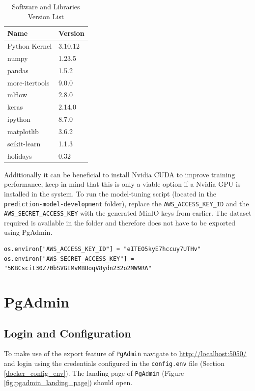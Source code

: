 \begin{table}[H]
\centering
\begin{tabular}{ll}
\hline
\textbf{Name}         & \textbf{Version} \\ \hline
Python Kernel & 3.10.12      \\
numpy         & 1.23.5       \\
pandas        & 1.5.2        \\
more-itertools & 9.0.0       \\
mlflow        & 2.8.0        \\
keras         & 2.14.0       \\
ipython       & 8.7.0        \\
matplotlib    & 3.6.2        \\
scikit-learn  & 1.1.3        \\
holidays      & 0.32         \\ \hline
\end{tabular}
\caption{Software and Libraries Version List}
\label{tab:software_version}
\end{table}

Additionally it can be beneficial to install Nvidia CUDA \cite{NVIDIACUDAToolkit} to improve training performance, keep in mind that this is only a viable option if a Nvidia GPU is installed in the system. To run the model-tuning script (located in the \texttt{prediction-model-development} folder), replace the \texttt{AWS\_ACCESS\_KEY\_ID} and the \texttt{AWS\_SECRET\_ACCESS\_KEY} with the generated MinIO keys from earlier. The dataset required is available in the folder and therefore does not have to be exported using PgAdmin. \\
\begin{verbatim}
os.environ["AWS_ACCESS_KEY_ID"] = "eITEO5kyE7hccuy7UTHv"
os.environ["AWS_SECRET_ACCESS_KEY"] = "5KBCscit30Z70bSVGIMvMBBoqV8ydn232o2MW9RA"
\end{verbatim}

\section{PgAdmin}
\label{section:pgadmin_user_guide}
\subsection{Login and Configuration}
To make use of the export feature of \texttt{PgAdmin} navigate to \url{http://localhost:5050/} and login using the credentials configured in the \texttt{config.env} file (Section \ref{docker_config_env}). The landing page of \texttt{PgAdmin} (Figure \ref{fig:pgadmin_landing_page}) should open. 

